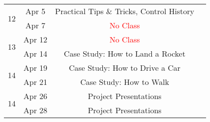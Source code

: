 \documentclass[11pt,letterpaper]{article}
\begin{document}
\begin{tabular}{c|c|c|c}
	 \hline
	\multirow{2}{*}{12}  & Apr 5 & Practical Tips \& Tricks, Control History &   \\
	 & Apr 7 & \textcolor{red}{No Class} &   \\
	 \hline
	\multirow{2}{*}{13}  & Apr 12 & \textcolor{red}{No Class} &  \\
	 & Apr 14 & Case Study: How to Land a Rocket &   \\
	 \hline
	\multirow{2}{*}{14}  & Apr 19 & Case Study: How to Drive a Car &  \\
	 & Apr 21 & Case Study: How to Walk &   \\
	 \hline
	\multirow{2}{*}{14}  & Apr 26 & Project Presentations &  \\
	 & Apr 28 & Project Presentations &   \\
\end{tabular}
\end{document}
